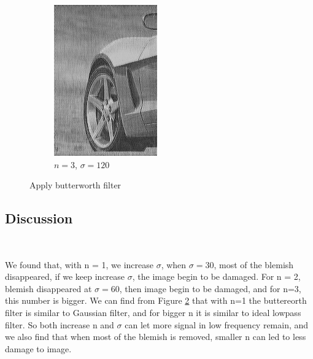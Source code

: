 \documentclass[
	12pt, %
]{style/fphw}
\begin{document}
\begin{figure}[H]
\begin{subfigure}[b]{.22\textwidth}
             \includegraphics[width=\textwidth]{plots2/Q5_3_2_120.png}
             \caption{$n=3$, $\sigma=120$}
             \label{Q5_3_3_120.tif}
         \end{subfigure}
     \caption{Apply butterworth filter}
     \label{Butterworth filter}
\end{figure}

\subsection*{Discussion} \

We found that, with n = 1, we increase $\sigma$, when $\sigma=30$, most of the blemish disappeared, if we keep increase $\sigma$, the image begin to be damaged. For n = 2, blemish disappeared at $\sigma=60$, then image begin to be damaged, and for n=3, this number is bigger. We can find from Figure \ref{Butterworth filter} that with n=1 the buttereorth filter is similar to Gaussian filter, and for bigger n it is similar to ideal lowpass filter. So both increase n and $\sigma$ can let more signal in low frequency remain, and we also find that when most of the blemish is removed, smaller n can led to less damage to image.
\end{document}
